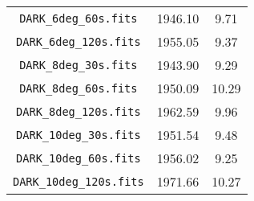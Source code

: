 \begin{table}[ht]
\begin{tabular}{ccc}
\verb|DARK_6deg_60s.fits| & \num{1946.10} & \num{9.71}\\
\verb|DARK_6deg_120s.fits| & \num{1955.05} & \num{9.37}\\
\verb|DARK_8deg_30s.fits| & \num{1943.90} & \num{9.29}\\
\verb|DARK_8deg_60s.fits| & \num{1950.09} & \num{10.29}\\
\verb|DARK_8deg_120s.fits| & \num{1962.59} & \num{9.96}\\
\verb|DARK_10deg_30s.fits| & \num{1951.54} & \num{9.48}\\
\verb|DARK_10deg_60s.fits| & \num{1956.02} & \num{9.25}\\
\verb|DARK_10deg_120s.fits| & \num{1971.66} & \num{10.27}\\
\bottomrule
\end{tabular}
\end{table}